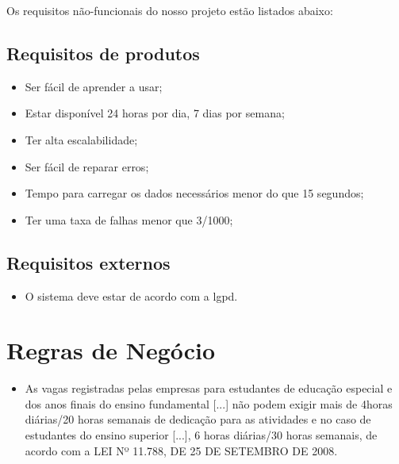 Os requisitos não-funcionais do nosso projeto estão listados abaixo:

\subsection{Requisitos de produtos}

\begin{itemize}
	\item Ser fácil de aprender a usar;
	\item Estar disponível 24 horas por dia, 7 dias por semana;
	\item Ter alta escalabilidade;
	\item Ser fácil de reparar erros;
	\item Tempo para carregar os dados necessários menor do que 15 segundos;
	\item Ter uma taxa de falhas menor que 3/1000;
\end{itemize}

\subsection{Requisitos externos}

\begin{itemize}
	\item O sistema deve estar de acordo com a \ac{lgpd}.
\end{itemize}

\section{Regras de Negócio}
\begin{itemize}
	\item As vagas registradas pelas empresas para estudantes de educação especial e dos anos finais do ensino fundamental [...] não podem exigir mais de 4horas diárias/20 horas semanais de dedicação para as atividades e no caso de estudantes do ensino superior [...], 6 horas diárias/30 horas semanais, de acordo com a LEI Nº 11.788, DE  25 DE SETEMBRO DE 2008.
\end{itemize}

